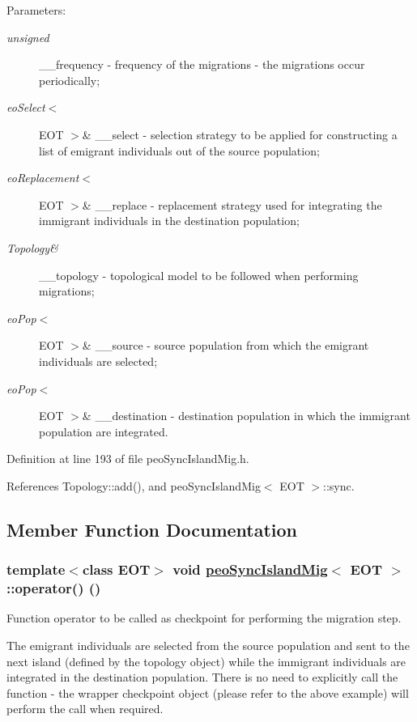 \begin{Desc}
\item[Parameters:]
\begin{description}
\item[{\em unsigned}]\_\-\_\-frequency - frequency of the migrations - the migrations occur periodically; \item[{\em eo\-Select$<$}]EOT $>$\& \_\-\_\-select - selection strategy to be applied for constructing a list of emigrant individuals out of the source population; \item[{\em eo\-Replacement$<$}]EOT $>$\& \_\-\_\-replace - replacement strategy used for integrating the immigrant individuals in the destination population; \item[{\em Topology\&}]\_\-\_\-topology - topological model to be followed when performing migrations; \item[{\em eo\-Pop$<$}]EOT $>$\& \_\-\_\-source - source population from which the emigrant individuals are selected; \item[{\em eo\-Pop$<$}]EOT $>$\& \_\-\_\-destination - destination population in which the immigrant population are integrated. \end{description}
\end{Desc}


Definition at line 193 of file peo\-Sync\-Island\-Mig.h.

References Topology::add(), and peo\-Sync\-Island\-Mig$<$ EOT $>$::sync.

\subsection{Member Function Documentation}
\hypertarget{classpeoSyncIslandMig_178476fd276f78b73607b33d19522c36}{
\subsubsection[operator()]{\setlength{\rightskip}{0pt plus 5cm}template$<$class EOT$>$ void \hyperlink{classpeoSyncIslandMig}{peo\-Sync\-Island\-Mig}$<$ EOT $>$::operator() ()}}
\label{classpeoSyncIslandMig_178476fd276f78b73607b33d19522c36}


Function operator to be called as checkpoint for performing the migration step. 

The emigrant individuals are selected from the source population and sent to the next island (defined by the topology object) while the immigrant individuals are integrated in the destination population. There is no need to explicitly call the function - the wrapper checkpoint object (please refer to the above example) will perform the call when required. 

